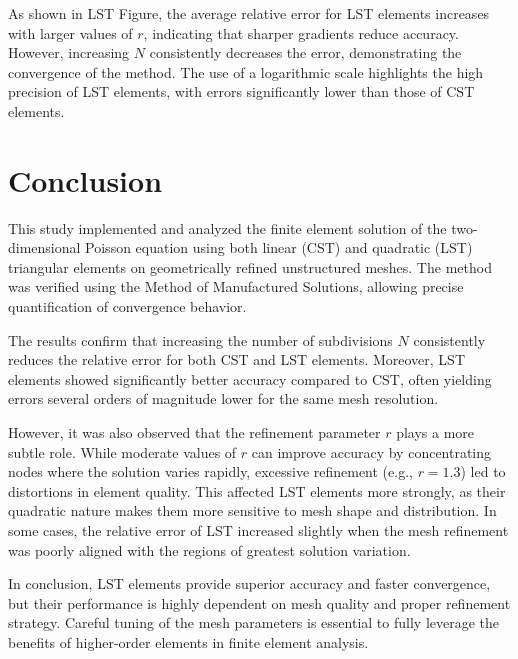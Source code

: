 \documentclass[12pt]{article}
\begin{document}
\vspace{0.3cm}
\noindent
As shown in LST Figure, the average relative error for LST elements increases with larger values of $r$, indicating that sharper gradients reduce accuracy. However, increasing $N$ consistently decreases the error, demonstrating the convergence of the method. The use of a logarithmic scale highlights the high precision of LST elements, with errors significantly lower than those of CST elements.



\newpage
\section{Conclusion}

This study implemented and analyzed the finite element solution of the two-dimensional Poisson equation using both linear (CST) and quadratic (LST) triangular elements on geometrically refined unstructured meshes. The method was verified using the Method of Manufactured Solutions, allowing precise quantification of convergence behavior.

The results confirm that increasing the number of subdivisions $N$ consistently reduces the relative error for both CST and LST elements. Moreover, LST elements showed significantly better accuracy compared to CST, often yielding errors several orders of magnitude lower for the same mesh resolution.

However, it was also observed that the refinement parameter $r$ plays a more subtle role. While moderate values of $r$ can improve accuracy by concentrating nodes where the solution varies rapidly, excessive refinement (e.g., $r = 1.3$) led to distortions in element quality. This affected LST elements more strongly, as their quadratic nature makes them more sensitive to mesh shape and distribution. In some cases, the relative error of LST increased slightly when the mesh refinement was poorly aligned with the regions of greatest solution variation.

In conclusion, LST elements provide superior accuracy and faster convergence, but their performance is highly dependent on mesh quality and proper refinement strategy. Careful tuning of the mesh parameters is essential to fully leverage the benefits of higher-order elements in finite element analysis.
\end{document}
